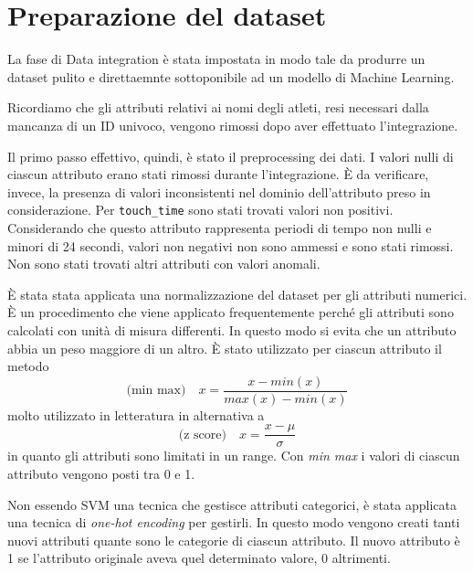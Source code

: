 \section{Preparazione del dataset}

La fase di Data integration è stata impostata in modo tale da produrre un dataset pulito e direttaemnte sottoponibile ad un modello di Machine Learning.

Ricordiamo che gli attributi relativi ai nomi degli atleti, resi necessari dalla mancanza di un ID univoco, vengono rimossi dopo aver effettuato l'integrazione.

Il primo passo effettivo, quindi, è stato il preprocessing dei dati. I valori nulli di ciascun attributo erano stati rimossi durante l'integrazione. È da verificare, invece, la presenza di valori inconsistenti nel dominio dell'attributo preso in considerazione.
Per \texttt{touch\_time} sono stati trovati valori non positivi. Considerando che questo attributo rappresenta periodi di tempo non nulli e minori di 24 secondi, valori non negativi non sono ammessi e sono stati rimossi.
Non sono stati trovati altri attributi con valori anomali.

\par

È stata stata applicata una normalizzazione del dataset per gli attributi numerici. È un procedimento che viene applicato frequentemente perché gli attributi sono calcolati con unità di misura differenti. In questo modo si evita che un attributo abbia un peso maggiore di un altro. È stato utilizzato per ciascun attributo il metodo
\begin{equation}
\text{(min max)}\quad x = \dfrac{x - min(x)}{max(x) - min(x)}
\end{equation}
molto utilizzato in letteratura in alternativa a
\begin{equation}
\text{(z score)}\quad x = \dfrac{x - \mu}{\sigma}
\end{equation}
 in quanto gli attributi sono limitati in un range. Con \textit{min max} i valori di ciascun attributo vengono posti tra 0 e 1.

\par
Non essendo SVM una tecnica che gestisce attributi categorici, è stata applicata una tecnica di \textit{one-hot encoding} per gestirli. In questo modo vengono creati tanti nuovi attributi quante sono le categorie di ciascun attributo. Il nuovo attributo è 1 se l'attributo originale aveva quel determinato valore, 0 altrimenti.